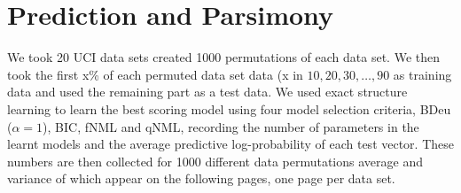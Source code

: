 \section{Prediction and Parsimony}

We took 20 UCI data sets created 1000 permutations of each data set.
We then took the first x\% of each permuted data set data (x in
${10,20,30,\ldots,90}$ as training data and used the remaining part as
a test data. We used exact structure learning to learn the best
scoring model using four model selection criteria, BDeu ($\alpha=1$),
BIC, fNML and qNML, recording the number of parameters in the learnt
models and the average predictive log-probability of each test
vector. These numbers are then collected for 1000 different data
permutations average and variance of which appear on the following
pages, one page per data set.


